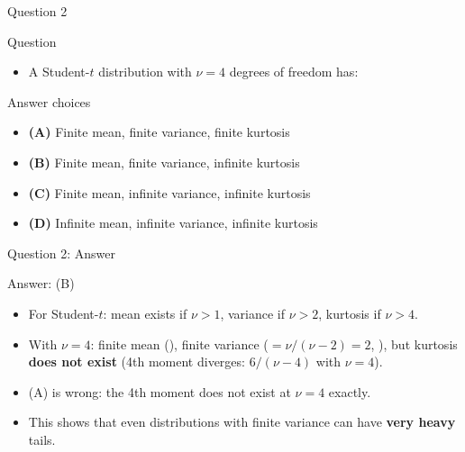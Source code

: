 \documentclass[9pt, aspectratio=169, t]{beamer}
\theoremstyle{definition}
\newenvironment{cminipage}[1]{%
    \par\noindent\hfill\begin{minipage}{#1}\ignorespaces
}{%
    \end{minipage}\hfill\null\par
}
\begin{document}
\begin{frame}{Question 2}
    \begin{cminipage}{0.95\textwidth}
    \begin{alertblock}{Question}
        \begin{itemize}
            \item A Student-$t$ distribution with $\nu = 4$ degrees of freedom has:
        \end{itemize}
    \end{alertblock}

    \vspace{0.3cm}

    \begin{block}{Answer choices}
        \begin{itemize}\setlength{\itemsep}{2pt}
        \item \textcolor{MainBlue}{\textbf{(A)}} Finite mean, finite variance, finite kurtosis
        \item \textcolor{MainBlue}{\textbf{(B)}} Finite mean, finite variance, infinite kurtosis
        \item \textcolor{MainBlue}{\textbf{(C)}} Finite mean, infinite variance, infinite kurtosis
        \item \textcolor{MainBlue}{\textbf{(D)}} Infinite mean, infinite variance, infinite kurtosis
        \end{itemize}
    \end{block}
    \end{cminipage}
\end{frame}

\begin{frame}{Question 2: Answer}
    \begin{cminipage}{0.95\textwidth}
    \begin{exampleblock}{Answer: (B)}
    \begin{itemize}
        \item For Student-$t$: mean exists if $\nu > 1$, variance if $\nu > 2$, kurtosis if $\nu > 4$.
        \item With $\nu = 4$: finite mean (\checkmark), finite variance ($= \nu/(\nu-2) = 2$, \checkmark), but kurtosis \textbf{does not exist} (4th moment diverges: $6/(\nu-4)$ with $\nu=4$).
        \item (A) is wrong: the 4th moment does not exist at $\nu = 4$ exactly.
        \item This shows that even distributions with finite variance can have \textbf{very heavy} tails.
    \end{itemize}
    \end{exampleblock}
    \end{cminipage}
\end{frame}
\end{document}
